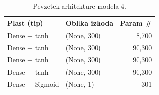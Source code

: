 \documentclass{article}
\begin{document}
\begin{table}[H]
\centering
\begin{tabular}{|l|l|r|}
\hline
\textbf{Plast (tip)}         & \textbf{Oblika izhoda} & \textbf{Param \#} \\
\hline
Dense + tanh               & (None, 300)            & 8,700         \\
Dense + tanh               & (None, 300)            & 90,300        \\
Dense + tanh               & (None, 300)            & 90,300        \\
Dense + tanh               & (None, 300)            & 90,300        \\
Dense + Sigmoid               & (None, 1)              & 301           \\
\hline
\end{tabular}
\caption{Povzetek arhitekture modela 4.}
\label{tab:model4}
\end{table}
\end{document}
